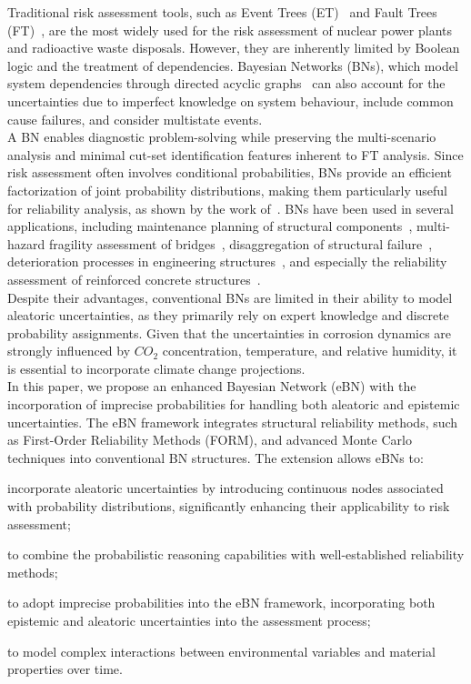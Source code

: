 Traditional risk assessment tools, such as Event Trees (ET)~\cite{papazoglou_mathematical_1998} and Fault Trees (FT)~\cite{kabir_overview_2017}, are the most widely used for the risk assessment of nuclear power plants and radioactive waste disposals.
However, they are inherently limited by Boolean logic and the treatment of dependencies.
Bayesian Networks (BNs), which model system dependencies through directed acyclic graphs~\cite{mahadevan2001bayesian} can also account for the uncertainties due to imperfect knowledge on system behaviour, include common cause failures, and consider multistate events. \\
A BN enables diagnostic problem-solving while preserving the multi-scenario analysis and minimal cut-set identification features inherent to FT analysis.
Since risk assessment often involves conditional probabilities, BNs provide an efficient factorization of joint probability distributions, making them particularly useful for reliability analysis, as shown by the work of~\textcite{langseth_bayesian_2007}.
BNs have been used in several applications, including maintenance planning of structural components~\cite{morato2022optimal}, multi-hazard fragility assessment of bridges~\cite{gehl2016development, barros2024gaussian}, disaggregation of structural failure~\cite{yazdani2020bayesian}, deterioration processes in engineering structures~\cite{luque2019risk,lee2023dynamic,tran2020dynamic}, and especially the reliability assessment of reinforced concrete structures~\cite{hackl2016reliability,hosseini2024dynamic,guo2024mixed}.\\
Despite their advantages, conventional BNs are limited in their ability to model aleatoric uncertainties, as they primarily rely on expert knowledge and discrete probability assignments.
Given that the uncertainties in corrosion dynamics are strongly influenced by $CO_2$ concentration, temperature, and relative humidity, it is essential to incorporate climate change projections.\\
In this paper, we propose an enhanced Bayesian Network (eBN) with the incorporation of imprecise probabilities for handling both aleatoric and epistemic uncertainties.
The eBN framework integrates structural reliability methods, such as First-Order Reliability Methods (FORM), and advanced Monte Carlo techniques into conventional BN structures. 
The extension allows eBNs to: 
\begin{enumerate*}[label=\roman*)]
  \item incorporate aleatoric uncertainties by introducing continuous nodes associated with probability distributions, significantly enhancing their applicability to risk assessment;
  \item to combine the probabilistic reasoning capabilities with well-established reliability methods;
  \item to adopt imprecise probabilities into the eBN framework, incorporating both epistemic and aleatoric uncertainties into the assessment process;
  \item to model complex interactions between environmental variables and material properties over time.
\end{enumerate*} 
